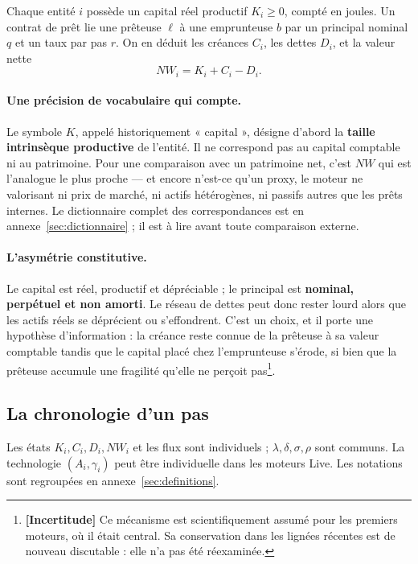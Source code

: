 \documentclass[11pt,a4paper]{article}
\newcommand{\incertitude}{\textbf{[Incertitude]}}
\begin{document}
Chaque entité $i$ possède un capital réel productif $K_i \ge 0$, compté en
joules. Un contrat de prêt lie une prêteuse $\ell$ à une emprunteuse $b$ par un
principal nominal $q$ et un taux par pas $r$. On en déduit les créances $C_i$,
les dettes $D_i$, et la valeur nette
\[
NW_i = K_i + C_i - D_i.
\]

\paragraph{Une précision de vocabulaire qui compte.} Le symbole $K$, appelé
historiquement « capital », désigne d'abord la \textbf{taille intrinsèque
productive} de l'entité. Il ne correspond pas au capital comptable ni au
patrimoine. Pour une comparaison avec un patrimoine net, c'est $NW$ qui est
l'analogue le plus proche --- et encore n'est-ce qu'un proxy, le moteur ne
valorisant ni prix de marché, ni actifs hétérogènes, ni passifs autres que les
prêts internes. Le dictionnaire complet des correspondances est en
annexe~\ref{sec:dictionnaire} ; il est à lire avant toute comparaison externe.

\paragraph{L'asymétrie constitutive.} Le capital est réel, productif et
dépréciable ; le principal est \textbf{nominal, perpétuel et non amorti}. Le
réseau de dettes peut donc rester lourd alors que les actifs réels se
déprécient ou s'effondrent. C'est un choix, et il porte une hypothèse
d'information : la créance reste connue de la prêteuse à sa valeur comptable
tandis que le capital placé chez l'emprunteuse s'érode, si bien que la prêteuse
accumule une fragilité qu'elle ne perçoit pas\footnote{\incertitude{} Ce
mécanisme est scientifiquement assumé pour les premiers moteurs, où il était
central. Sa conservation dans les lignées récentes est de nouveau discutable :
elle n'a pas été réexaminée.}.



\subsection{La chronologie d'un pas}\label{sec:pas}

Les états $K_i,C_i,D_i,NW_i$ et les flux sont individuels ;
$\lambda,\delta,\sigma,\rho$ sont communs. La technologie
$(A_i,\gamma_i)$ peut être individuelle dans les moteurs Live.
Les notations sont regroupées en annexe~\ref{sec:definitions}.
\end{document}

